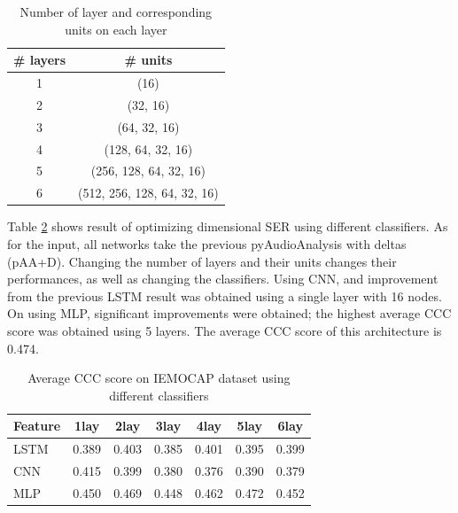 \begin{table}
  \caption{Number of layer and corresponding units on each layer}
  \begin{center}
      \begin{tabular}{c  c}
          \hline
          \# layers   &   \# units \\
          \hline \hline
          1   &   (16) \\
          2   &   (32, 16) \\
          3   &   (64, 32, 16) \\
          4   &   (128, 64, 32, 16) \\
          5   &   (256, 128, 64, 32, 16) \\
          6   &   (512, 256, 128, 64, 32, 16) \\
          \hline
      \end{tabular}
      \label{tab:layer}
  \end{center}
\end{table} 

Table \ref{tab:iemocap-optim} shows result of optimizing dimensional SER using
different classifiers. As for the input, all networks take the previous
pyAudioAnalysis with deltas (pAA+D). Changing the number of layers and their
units changes their performances, as well as changing the classifiers. Using
CNN, and improvement from the previous LSTM result was obtained using a single
layer with 16 nodes. On using MLP, significant improvements were obtained; the
highest average CCC score was obtained using 5 layers. The average CCC score of
this architecture is 0.474.

\begin{table}
    \caption{Average CCC score on IEMOCAP dataset using different classifiers}
    \begin{center}
    \begin{tabular}{l | c c c c c c}
      \hline 
      Feature &   1lay	& 2lay	& 3lay	& 4lay	& 5lay	& 6lay  \\
      \hline \hline
      LSTM	& 0.389	& 0.403	& 0.385	& 0.401	& 0.395	& 0.399 \\
      CNN	  & 0.415	& 0.399	& 0.380	& 0.376	& 0.390	& 0.379 \\
      MLP	  & 0.450	& 0.469	& 0.448	& 0.462	& 0.472	& 0.452 \\
      \hline
    \end{tabular}
    \label{tab:iemocap-optim}
  \end{center}
\end{table}

